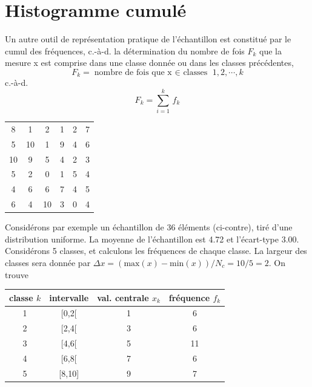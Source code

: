 \section{Histogramme cumulé}

Un autre outil de représentation pratique de l'échantillon est constitué par le cumul des fréquences, c.-à-d. la détermination du nombre de fois $F_k$ que la mesure x est comprise dans une classe donnée ou dans les classes précédentes,
$$
    F_k=\text{nombre de fois que x $\in$ classes } 1,2,\cdots,k
$$
c.-à-d.
\begin{equation}
    F_k=\sum\limits_{i=1}^{k}\,f_k
\end{equation}
\begin{table}
    \centering
    \vspace{-6mm}
    \begin{tabular}{cccccc}
        8  & 1  & 2  & 1 & 2 & 7 \\
        5  & 10 & 1  & 9 & 4 & 6 \\
        10 & 9  & 5  & 4 & 2 & 3 \\
        5  & 2  & 0  & 1 & 5 & 4 \\
        4  & 6  & 6  & 7 & 4 & 5 \\
        6  & 4  & 10 & 3 & 0 & 4
    \end{tabular}
\end{table}
Considérons par exemple un échantillon de 36 éléments (ci-contre), tiré d'une distribution uniforme. La moyenne de l'échantillon est 4.72 et l'écart-type 3.00. Considérons 5 classes, et calculons les fréquences de chaque classe. La largeur des classes sera donnée par $\Delta x=(\text{max}(x)-\text{min}(x))/N_c=10/5=2$. On trouve
\begin{center}
    \begin{tabular}{cccc}
        classe $k$ & intervalle & val. centrale $x_k$ & fréquence $f_k$ \\\hline
        1          & [0,2[      & 1                   & 6               \\
        2          & [2,4[      & 3                   & 6               \\
        3          & [4,6[      & 5                   & 11              \\
        4          & [6,8[      & 7                   & 6               \\
        5          & [8,10]     & 9                   & 7               \\\hline
    \end{tabular}
\end{center}
